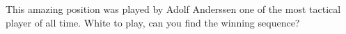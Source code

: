 \documentclass{article}
\begin{document}
This amazing position was played by Adolf Anderssen one of the most tactical player of all time. White to play, can you find the winning sequence?

\newgame



\begin{center}
\showboard
\end{center}
\end{document}
